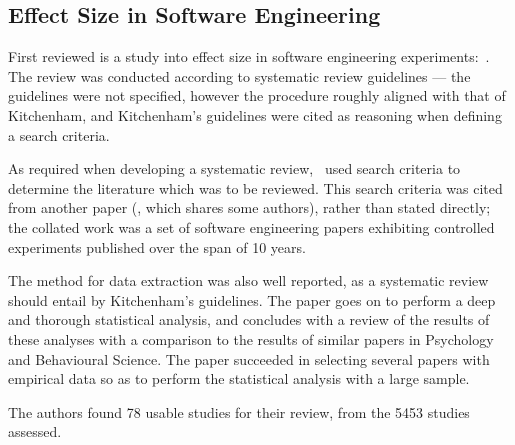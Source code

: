\subsection{Effect Size in Software Engineering}
First reviewed is a study into effect size in software engineering experiments:~\citet*{Kampenes2007}. The review was conducted according to systematic review guidelines --- the guidelines were not specified, however the procedure roughly aligned with that of Kitchenham, and Kitchenham's guidelines were cited as reasoning when defining a search criteria.\par

As required when developing a systematic review,~\cite{Kampenes2007} used search criteria to determine the literature which was to be reviewed. This search criteria was cited from another paper (\cite{Sjoberg2005}, which shares some authors), rather than stated directly; the collated work was a set of software engineering papers exhibiting controlled experiments published over the span of 10 years.\par

The method for data extraction was also well reported, as a systematic review should entail by Kitchenham's guidelines. The paper goes on to perform a deep and thorough statistical analysis, and concludes with a review of the results of these analyses with a comparison to the results of similar papers in Psychology and Behavioural Science. The paper succeeded in selecting several papers with empirical data so as to perform the statistical analysis with a large sample.\par

The authors found 78 usable studies for their review, from the 5453 studies assessed.\par

